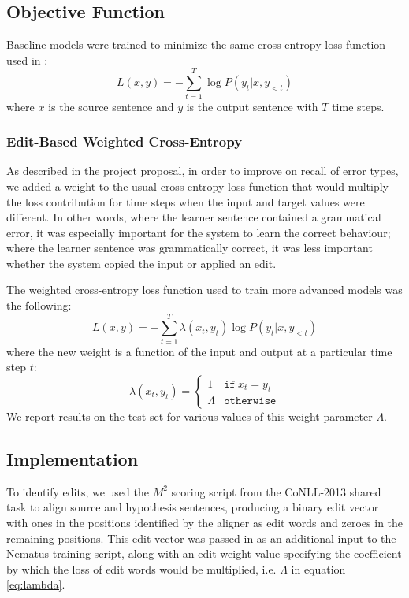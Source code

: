 \subsection{Objective Function}
Baseline models were trained to minimize the same cross-entropy loss function used in \citet{Xie2016NeuralAttention}:
\begin{equation} \label{eq:cross-entropy}
	L(x,y)=-\sum_{t=1}^{T}\log P(y_t|x,y_{<t})
\end{equation}
where $x$ is the source sentence and $y$ is the output sentence with $T$ time steps.

\subsubsection{Edit-Based Weighted Cross-Entropy}
As described in the project proposal, in order to improve on recall of error types, we added a weight to the usual cross-entropy loss function that would multiply the loss contribution for time steps when the input and target values were different. In other words, where the learner sentence contained a grammatical error, it was especially important for the system to learn the correct behaviour; where the learner sentence was grammatically correct, it was less important whether the system copied the input or applied an edit.

The weighted cross-entropy loss function used to train more advanced models was the following:
\begin{equation} \label{eq:weighted-ce}
	L(x,y)=-\sum_{t=1}^{T}\lambda(x_t,y_t) \log P(y_t|x,y_{<t})
\end{equation}
where the new weight is a function of the input and output at a particular time step $t$:
\begin{equation} \label{eq:lambda}
	\lambda(x_t,y_t)=
    \begin{cases}
    	1 & \texttt{if}\ x_t=y_t \\
        \Lambda & \texttt{otherwise}
    \end{cases}
\end{equation}
We report results on the test set for various values of this weight parameter $\Lambda$.

\subsection{Implementation}
To identify edits, we used the $M^2$ scoring script from the CoNLL-2013 shared task to align source and hypothesis sentences, producing a binary edit vector with ones in the positions identified by the aligner as edit words and zeroes in the remaining positions. This edit vector was passed in as an additional input to the Nematus training script, along with an edit weight value specifying the coefficient by which the loss of edit words would be multiplied, i.e. $\Lambda$ in equation \ref{eq:lambda}.

